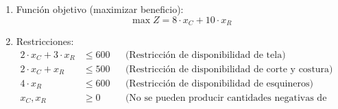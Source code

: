 \documentclass[../main.tex]{subfiles}
\begin{document}
\begin{exercise}
\begin{enumerate}
                \item Función objetivo (maximizar beneficio):
                    \begin{equation}
                        \max Z = 8 \cdot x_C + 10 \cdot x_R
                    \end{equation}
                \item Restricciones:
                    \begin{equation}
                        \begin{aligned}
                            2 \cdot x_C + 3 \cdot x_R &\leq 600 && \text{(Restricción de disponibilidad de tela)} \\
                            2 \cdot x_C + x_R &\leq 500 && \text{(Restricción de disponibilidad de corte y costura)}\\
                            4 \cdot x_R &\leq 600 && \text{(Restricción de disponibilidad de esquineros)}\\
                            x_C, x_R & \geq 0 && \text{(No se pueden producir cantidades negativas de productos)}\\
                        \end{aligned}
                    \end{equation}

            \end{enumerate}
        \end{exercise} 
\end{document}
